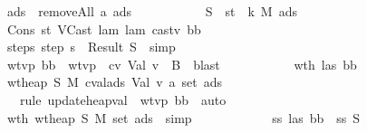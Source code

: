 \begin{isabellebody}
\ \ \ \ \ \ \ \ \ \ \isamarkupfalse \ {\isacharquery}ads\ {\isacharequal}\ {\isachardoublequoteopen}removeAll\ a\ ads{}{\isachardoublequoteclose}\isanewline
\ \ \ \ \ \ \ \ \ \ \isamarkupfalse \ {\isacharquery}S\ {\isacharequal}\ {\isachardoublequoteopen}{\isacharparenleft}st{\isacharcomma}\ {\isasymrho}{\isacharcomma}\ k{\isacharcomma}\ {\isacharquery}M{}{\isacharcomma}\ {\isacharquery}ads{\isacharparenright}{\isachardoublequoteclose}\isanewline
\ \ \ \ \ \ \ \ \ \ \isamarkupfalse \ Cons\ st\ VCast\ lam\ lam{}\ castv\ b{}b\isanewline
\ \ \ \ \ \ \ \ \ \ \isamarkupfalse \ steps{\isacharcolon}\ {\isachardoublequoteopen}step\ s\ {\isacharequal}\ Result\ {\isacharquery}S{\isachardoublequoteclose}\ \isamarkupfalse \ simp\isanewline
\ \ \ \ \ \ \ \ \ \ \isamarkupfalse \ wtvp\ bb\ \isamarkupfalse \ wtvp{}{\isacharcolon}\ {\isachardoublequoteopen}{\isasymSigma}{\isacharprime}\ {\isasymturnstile}cv\ Val\ v{\isacharprime}\ {\isacharcolon}\ B{\isachardoublequoteclose}\ \isamarkupfalse \ blast\isanewline
\isanewline
\ \ \ \ \ \ \ \ \ \ \isamarkupfalse \ wth{}\ las{}\ b{}b\isanewline
\ \ \ \ \ \ \ \ \ \ \isamarkupfalse \ {\isachardoublequoteopen}wt{\isacharunderscore}heap\ {\isacharquery}S{}\ {\isacharquery}M{}\ {\isacharparenleft}cval{\isacharunderscore}ads\ {\isacharparenleft}Val\ v{\isacharprime}{\isacharparenright}\ a\ {\isacharparenleft}set\ ads{}{\isacharparenright}{\isacharparenright}{\isachardoublequoteclose}\ \isanewline
\ \ \ \ \ \ \ \ \ \ \ \ \isamarkupfalse \ {\isacharparenleft}rule\ update{\isacharunderscore}heap{\isacharunderscore}val{\isacharparenright}\ \isamarkupfalse \ wtvp\ bb\ \isamarkupfalse \ auto\ \isamarkupfalse \isanewline
\ \ \ \ \ \ \ \ \ \ \isamarkupfalse \ wth{}{\isacharcolon}\ {\isachardoublequoteopen}wt{\isacharunderscore}heap\ {\isacharquery}S{}\ {\isacharquery}M{}\ {\isacharparenleft}set\ {\isacharquery}ads{\isacharparenright}{\isachardoublequoteclose}\ \isamarkupfalse \ simp\ \isamarkupfalse \isanewline
\ \ \ \ \ \ \ \ \ \ \isamarkupfalse \ ss\ las{}\ b{}b\ \isamarkupfalse \ ss{}{\isacharcolon}\ {\isachardoublequoteopen}{\isacharquery}S{}\ {\isasymsqsubseteq}\ {\isasymSigma}{\isachardoublequoteclose}\isanewline

\end{isabellebody}
